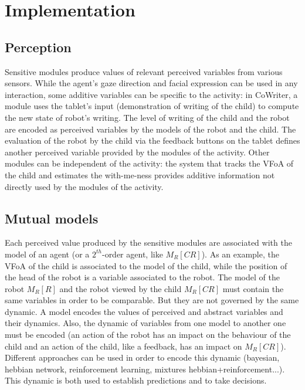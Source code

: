 \documentclass[10pt,a4paper]{article}
\begin{document}
\section{Implementation}\label{arch} 

\subsection{Perception}
\label{ssec:perception}
Sensitive modules produce values of relevant perceived variables from various sensors. 
While the agent's gaze direction and facial expression can be used in any interaction, some additive variables can be specific to the activity: in CoWriter, a module uses the tablet's input (demonstration of writing of the child) to compute the new state of robot's writing. The level of writing of the child and the robot are encoded as perceived variables by the models of the robot and the child.
The evaluation of the robot by the child via the feedback buttons on the tablet defines another perceived variable provided by the modules of the activity. 
Other modules can be independent of the activity: the system that tracks the VFoA of the child and estimates the with-me-ness provides additive information not directly used by the modules of the activity.  

\subsection{Mutual models}
\label{ssec:mmm}
Each perceived value produced by the sensitive modules are associated with the model of an agent (or a $2^{th}$-order agent, like $M_R\left[CR\right]$). As an example, the VFoA of the child is associated to the model of the child, while the position of the head of the robot is a variable associated to the robot.
The model of the robot $M_R\left[R\right]$ and the robot viewed by the child $M_R\left[CR\right]$ must contain the same variables in order to be comparable. But they are not governed by the same dynamic.
A model encodes the values of perceived and abstract variables and their dynamics. Also, the dynamic of variables from one model to another one must be encoded (an action of the robot has an impact on the behaviour of the child and an action of the child, like a feedback, has an impact on $M_R\left[CR\right]$). Different approaches can be used in order to encode this dynamic (bayesian, hebbian network, reinforcement learning, mixtures hebbian+reinforcement...). This dynamic is both used to establish predictions and to take decisions.
\end{document}
